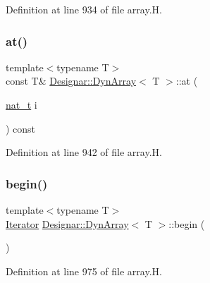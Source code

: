 Definition at line 934 of file array.\+H.

\mbox{\label{class_designar_1_1_dyn_array_a0bb20c2467a91bad1577fae7bed15828}} 
\subsubsection{\texorpdfstring{at()}{at()}\hspace{0.1cm}{\footnotesize\ttfamily [2/2]}}
{\footnotesize\ttfamily template$<$typename T$>$ \\
const T\& \hyperlink{class_designar_1_1_dyn_array}{Designar\+::\+Dyn\+Array}$<$ T $>$\+::at (\begin{DoxyParamCaption}\item[{\hyperlink{namespace_designar_aa72662848b9f4815e7bf31a7cf3e33d1}{nat\+\_\+t}}]{i }\end{DoxyParamCaption}) const\hspace{0.3cm}{\ttfamily [inline]}}



Definition at line 942 of file array.\+H.

\mbox{\label{class_designar_1_1_dyn_array_aa8032abbe4db89827ac88aa1ea932712}} 
\subsubsection{\texorpdfstring{begin()}{begin()}\hspace{0.1cm}{\footnotesize\ttfamily [1/2]}}
{\footnotesize\ttfamily template$<$typename T$>$ \\
\hyperlink{class_designar_1_1_dyn_array_1_1_iterator}{Iterator} \hyperlink{class_designar_1_1_dyn_array}{Designar\+::\+Dyn\+Array}$<$ T $>$\+::begin (\begin{DoxyParamCaption}{ }\end{DoxyParamCaption})\hspace{0.3cm}{\ttfamily [inline]}}



Definition at line 975 of file array.\+H.

\mbox{\label{class_designar_1_1_dyn_array_a36886c618a763286ec179f7fc7cffa68}} 
